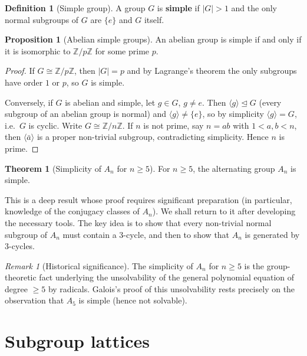 \documentclass[12pt,a4paper,openany]{book}
\theoremstyle{definition}
\newtheorem{definition}{Definition}[chapter]
\newtheorem{theorem}{Theorem}[chapter]
\newtheorem{proposition}{Proposition}[chapter]
\theoremstyle{remark}
\newtheorem{remark}{Remark}[chapter]
\newcommand{\Z}{\mathbb{Z}}
\begin{document}
\begin{definition}[Simple group]
\label{def:simple-group}
A group $G$ is \textbf{simple} if $|G|>1$ and the only normal subgroups of
$G$ are $\{e\}$ and $G$ itself.
\end{definition}

\begin{proposition}[Abelian simple groups]
\label{prop:abelian-simple}
An abelian group is simple if and only if it is isomorphic to $\Z/p\Z$ for
some prime $p$.
\end{proposition}

\begin{proof}
If $G\cong\Z/p\Z$, then $|G|=p$ and by Lagrange's theorem the only
subgroups have order $1$ or $p$, so $G$ is simple.

Conversely, if $G$ is abelian and simple, let $g\in G$, $g\neq e$.  Then
$\langle g\rangle\trianglelefteq G$ (every subgroup of an abelian group is
normal) and $\langle g\rangle\neq\{e\}$, so by simplicity
$\langle g\rangle=G$, i.e.\ $G$ is cyclic.  Write $G\cong\Z/n\Z$.  If $n$
is not prime, say $n=ab$ with $1<a,b<n$, then $\langle\bar a\rangle$ is a
proper non-trivial subgroup, contradicting simplicity.  Hence $n$ is prime.
\end{proof}

\begin{theorem}[Simplicity of $A_n$ for $n\ge 5$]
\label{thm:An-simple}
For $n\ge 5$, the alternating group $A_n$ is simple.
\end{theorem}

This is a deep result whose proof requires significant preparation (in
particular, knowledge of the conjugacy classes of $A_n$).  We shall return
to it after developing the necessary tools.  The key idea is to show that
every non-trivial normal subgroup of $A_n$ must contain a $3$-cycle, and
then to show that $A_n$ is generated by $3$-cycles.

\begin{remark}[Historical significance]
\label{rem:An-simple-history}
The simplicity of $A_n$ for $n\ge 5$ is the group-theoretic fact underlying
the unsolvability of the general polynomial equation of degree $\ge 5$ by
radicals.  Galois's proof of this unsolvability rests precisely on the
observation that $A_5$ is simple (hence not solvable).
\end{remark}

\section{Subgroup lattices}
\label{sec:ch2-lattice}
\end{document}
